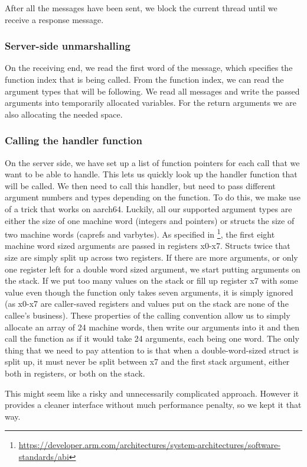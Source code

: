 After all the messages have been sent, we block the current thread until we receive a response message.

\subsubsection{Server-side unmarshalling}
On the receiving end, we read the first word of the message, which specifies the function index
that is being called. From the function index, we can read the argument types that will be following. We read all messages and write the passed arguments into temporarily
allocated variables. For the return arguments we are also allocating the needed space.

\subsubsection{Calling the handler function}
On the server side, we have set up a list of function pointers for each call that
we want to be able to handle. This lets us quickly look up the handler function that will be called.
We then need to call this handler, but need to pass different argument numbers and types depending
on the function. To do this, we make use of a trick that works on aarch64.
Luckily, all our supported argument types are either the size of one machine word (integers
and pointers) or structs the size of two machine words (caprefs and varbytes).
As specified in \footnote{\url{https://developer.arm.com/architectures/system-architectures/software-standards/abi}}, the first eight machine word sized arguments are passed in registers x0-x7.
Structs twice that size are simply split up across two registers. If there are more
arguments, or only one register left for a double word sized argument, we start putting arguments
on the stack. If we put too many values on the stack or fill up register x7 with some value
even though the function only takes seven arguments, it is simply ignored (as x0-x7 are
caller-saved registers and values put on the stack are none of the callee's business).
These properties of the calling convention allow us to simply allocate an array
of 24 machine words, then write our arguments into it and then call the function as if it would take 24 arguments, each being one word. The only thing that we need to pay attention to is
that when a double-word-sized struct is split up, it must never be split between x7 and the first stack argument, either both in registers, or both on the stack.

This might seem like a risky and unnecessarily complicated approach. However it provides a cleaner
interface without much performance penalty, so we kept it that way.

